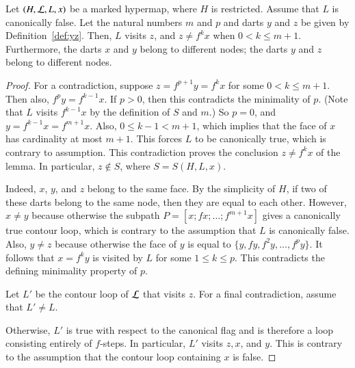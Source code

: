 \begin{lemma} \label{lemma:yz}
  Let $(H,{\cal L},L,x)$ be a marked hypermap, where $H$ is
  restricted.  Assume that $L$ is canonically
  false. %
  Let the natural numbers $m$ and $p$ and darts $y$ and $z$ be given
  by Definition~\ref{def:yz}.  Then, $L$ visits $z$, and $z\ne f^k x$
  when $0 < k \le {m+1}$.  Furthermore, the darts $x$ and $y$ belong
  to different nodes; the darts $y$ and $z$ belong to different nodes.
\end{lemma}

\begin{proof} 
  For a contradiction, suppose $z=f^{p+1} y = f^k x$ for some $0<k\le
  m+1$.  Then also, $f^p y = f^{k-1} x$.  If $p>0$, then this
  contradicts the minimality of $p$.  (Note that $L$ visits $f^{k-1}x$
  by the definition of $S$ and $m$.)  So $p=0$, and $y=f^{k-1} x =
  f^{m+1} x$.  Also, $0\le k-1 < {m+1}$, which implies that the face
  of $x$ has cardinality at most $m+1$.  This forces $L$ to be canonically
  true, which is contrary to assumption.  This contradiction proves the
  conclusion $z\ne f^k x$ of the lemma.  In particular, $z\not\in S$, where $S =
  S(H,L,x)$.

    Indeed, $x$, $y$, and $z$
  belong to the same face.  By the simplicity of $H$, if two of these
  darts belong to the same node, then they are equal to each other.
  However, $x\ne y$ because otherwise the subpath $P=[x;f
  x;\ldots;f^{m+1}x]$ gives a canonically true contour loop, which is
  contrary to the assumption that $L$ is canonically false.  Also,
  $y\ne z$ because otherwise the face of $y$ is equal to $\{y,f y,f^2
  y,\ldots,f^p y\}$.  It follows that $x = f^k y$ is visited by $L$
  for some $1\le k\le p$.  This contradicts the defining minimality
  property of $p$.

  Let $L'$ be the contour loop of ${\cal L}$ that visits $z$.  For a final
  contradiction, assume that $L'\ne L$.

    Otherwise, $L'$ is true with respect to the
  canonical flag and is therefore a loop consisting entirely of
  $f$-steps.  In particular, $L'$ visits $z,x$, and $y$.  This is
  contrary to the assumption that the contour loop containing $x$ is
  false.


\end{proof}
